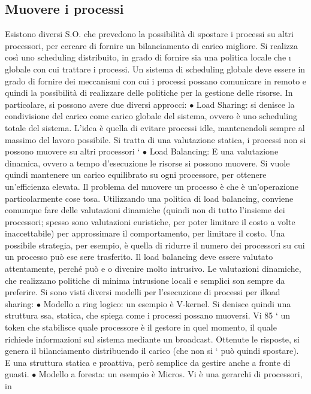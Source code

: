 \subsection{Muovere i processi}
Esistono diversi S.O. che prevedono la possibilità di spostare i processi su altri
processori, per cercare di fornire un bilanciamento di carico migliore. Si realizza
così uno scheduling distribuito, in grado di fornire sia una politica locale che
\i{}
globale con cui trattare i processi. Un sistema di scheduling globale deve essere
in grado di fornire dei meccanismi con cui i processi possano comunicare in
remoto e quindi la possibilità di realizzare delle politiche per la gestione delle
risorse.
In particolare, si possono avere due diversi approcci:
$\bullet$ Load Sharing: si denisce la condivisione del carico come carico globale
del sistema, ovvero è uno scheduling totale del sistema. L'idea è quella di
evitare processi idle, mantenendoli sempre al massimo del lavoro possibile.
Si tratta di una valutazione statica, i processi non si possono muovere su
altri processori
`
$\bullet$ Load Balancing: E una valutazione dinamica, ovvero a tempo d'esecuzione
le risorse si possono muovere. Si vuole quindi mantenere un carico equilibrato su ogni processore, per ottenere
un'efficienza elevata.
Il problema del muovere un processo è che è un'operazione particolarmente cose
tosa. Utilizzando una politica di load balancing, conviene comunque fare delle
valutazioni dinamiche (quindi non di tutto l'insieme dei processori; spesso sono
valutazioni euristiche, per poter limitare il costo a volte inaccettabile) per approssimare il comportamento, per
limitare il costo. Una possibile strategia, per
esempio, è quella di ridurre il numero dei processori su cui un processo può ese
sere trasferito. Il load balancing deve essere valutato attentamente, perché può
e o
divenire molto intrusivo. Le valutazioni dinamiche, che realizzano politiche di
minima intrusione locali e semplici son sempre da preferire.
Si sono visti diversi modelli per l'esecuzione di processi per ilload sharing:
$\bullet$ Modello a ring logico: un esempio è V-kernel. Si denisce quindi una
struttura ssa, statica, che spiega come i processi possano muoversi. Vi
85
` un token che stabilisce quale processore è il gestore in quel momento, il
quale richiede informazioni sul sistema mediante un broadcast. Ottenute
le risposte, si genera il bilanciamento distribuendo il carico (che non si
`
può quindi spostare). E una struttura statica e proattiva, però semplice
da gestire anche a fronte di guasti.
$\bullet$ Modello a foresta: un esempio è Micros. Vi è una gerarchi di processori, in
